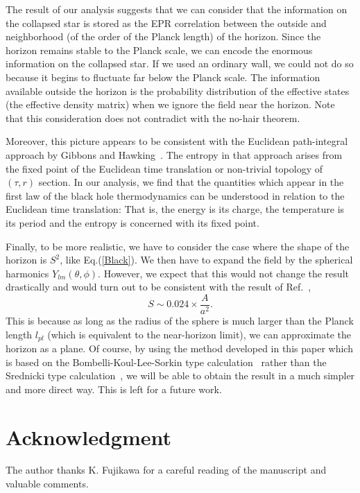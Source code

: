 The result of our analysis suggests that
we can consider that the information on the collapsed
star is stored as the EPR correlation between
the outside and neighborhood
(of the order of the Planck length) of the horizon.
Since the horizon remains stable to the Planck scale,
we can encode the enormous information on
the collapsed star.
If we used an ordinary wall,
we could not do so because it begins to fluctuate
far below the Planck scale.
The information available outside the horizon is
the probability distribution of the effective states
(the effective density matrix)
when we ignore the field near the horizon.
Note that
this consideration does not contradict with
the no-hair theorem.

Moreover, this picture appears to be consistent with the Euclidean
path-integral approach by Gibbons and
Hawking~\cite{GibHaw77,Hawkin79,HawHun99}.
The entropy in that approach arises from the fixed point
of the Euclidean time translation or non-trivial topology
of $(\tau,r)$ section.
In our analysis, we find that the quantities
which appear in the first law
of the black hole thermodynamics
can be understood in relation to
the Euclidean time translation:
That is, the energy is its charge,
the temperature is its period and
the entropy is concerned with its fixed point.

Finally, 
to be more realistic,
we have to consider the case where the shape of
the horizon is $S^2$, like Eq.(\ref{Black}).
We then have to expand the field by the spherical harmonics
$Y_{lm}(\theta,\phi)$.
However, we expect that this would not change the result
drastically and would turn out to be
 consistent with the result of Ref.~\cite{MuSeKo98},
\begin{equation}
  S \sim 0.024 \times \frac{A}{a^2}.
\end{equation}
This is because as long as the radius of the sphere is much larger
than the Planck length $l_{pl}$
(which is equivalent to the near-horizon limit),
we can approximate the horizon as a plane.
Of course,
by using the method developed in this paper
which is based on the Bombelli-Koul-Lee-Sorkin
type calculation~\cite{BKLS86}
rather than the Srednicki type calculation~\cite{Sredni93},
we will be able to obtain the result in a much simpler
and more direct way.
This is left for a future work.

\section*{Acknowledgment}
The author thanks K. Fujikawa for a careful reading of
the manuscript and valuable comments.


